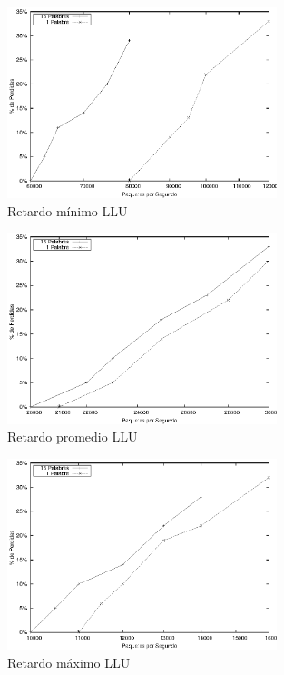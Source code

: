 \begin{figure}[!h]
  \centering
	\includegraphics[width=0.7\textwidth]{5-resultados/graf/llumin.eps}
  \caption{Retardo mínimo LLU}
  \label{fig}
\end{figure}
\begin{figure}[!h]
  \centering
	\includegraphics[width=0.7\textwidth]{5-resultados/graf/lluprom.eps}
  \caption{Retardo promedio LLU}
  \label{fig}
\end{figure}
\begin{figure}[!th]
  \centering
	\includegraphics[width=0.7\textwidth]{5-resultados/graf/llumax.eps}
  \caption{Retardo máximo LLU}
  \label{fig}
\end{figure}


